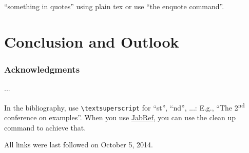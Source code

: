 \documentclass[runningheads,a4paper]{llncs}
\begin{document}
``something in quotes'' using plain tex or use \enquote{the enquote command}.

\section{Conclusion and Outlook}

\subsubsection*{Acknowledgments}
...

In the bibliography, use \texttt{\textbackslash textsuperscript} for ``st'', ``nd'', ...:
E.g., \enquote{The 2\textsuperscript{nd} conference on examples}.
When you use \href{http://www.jabref.org}{JabRef}, you can use the clean up command to achieve that.




All links were last followed on October 5, 2014.
\end{document}
